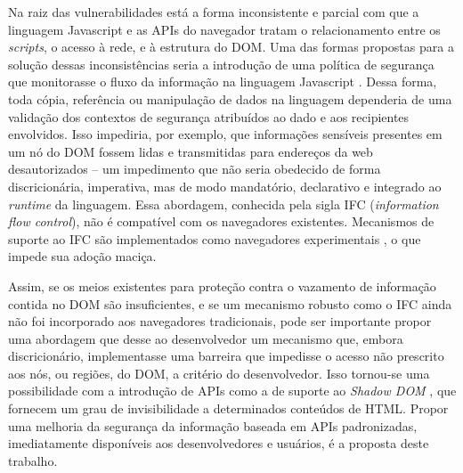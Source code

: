 Na raiz das vulnerabilidades está a forma inconsistente e parcial com que a linguagem Javascript e as APIs do navegador tratam o relacionamento entre os \textit{scripts}, o acesso à rede, e à estrutura do DOM. Uma das formas propostas para a solução dessas inconsistências seria a introdução de uma política de segurança que monitorasse o fluxo da informação na linguagem Javascript \cite[p.3]{Heule2015_IFC_Inside}. Dessa forma, toda cópia, referência ou manipulação de dados na linguagem dependeria de uma validação dos contextos de segurança atribuídos ao dado e aos recipientes envolvidos. Isso impediria, por exemplo, que informações sensíveis presentes em um nó do DOM fossem lidas e transmitidas para endereços da web desautorizados -- um impedimento que não seria obedecido de forma discricionária, imperativa, mas de modo mandatório, declarativo e integrado ao \textit{runtime} da linguagem. Essa abordagem, conhecida pela sigla IFC (\textit{information flow control}), não é compatível com os navegadores existentes. Mecanismos de suporte ao IFC são implementados como navegadores experimentais \cite{Hedin2014, Bichhawat2014}, o que impede sua adoção maciça.

Assim, se os meios existentes para proteção contra o vazamento de informação contida no DOM são insuficientes, e se um mecanismo robusto como o IFC ainda não foi incorporado aos navegadores tradicionais, pode ser importante propor uma abordagem que desse ao desenvolvedor um mecanismo que, embora discricionário, implementasse uma barreira que impedisse o acesso não prescrito aos nós, ou regiões, do DOM, a critério do desenvolvedor. Isso tornou-se uma possibilidade com a introdução de APIs como a de suporte ao \textit{Shadow DOM} \cite{W3C:ShadowDOM}, que fornecem um grau de invisibilidade a determinados conteúdos de HTML. Propor uma melhoria da segurança da informação baseada em APIs padronizadas, imediatamente disponíveis aos desenvolvedores e usuários, é a proposta deste trabalho.